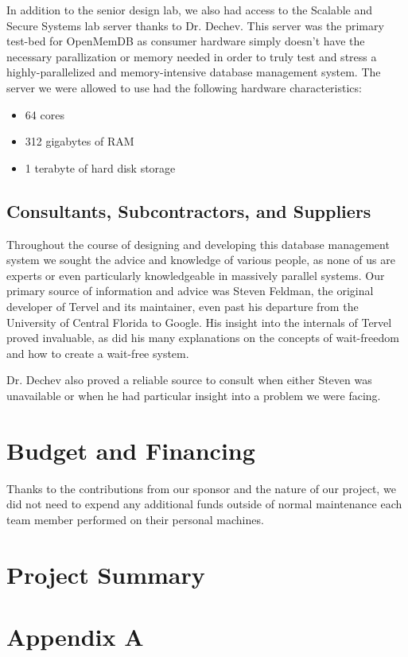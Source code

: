 \documentclass[letterpaper, 12pt]{article}
\begin{document}
\par\vspace{\baselineskip}
In addition to the senior design lab, we also had access to the Scalable and Secure Systems lab server
thanks to Dr. Dechev. This server was the primary test-bed for OpenMemDB as consumer hardware simply
doesn't have the necessary parallization or memory needed in order to truly test and stress a
highly-parallelized and memory-intensive database management system. The server we were allowed to
use had the following hardware characteristics:
\begin{itemize}
 \item 64 cores
 \item 312 gigabytes of RAM
 \item 1 terabyte of hard disk storage
\end{itemize}

\newpage

\subsection{Consultants, Subcontractors, and Suppliers}
Throughout the course of designing and developing this database management system we sought the advice
and knowledge of various people, as none of us are experts or even particularly knowledgeable in
massively parallel systems. Our primary source of information and advice was Steven Feldman, the
original developer of Tervel and its maintainer, even past his departure from the University of Central
Florida to Google. His insight into the internals of Tervel proved invaluable, as did his many
explanations on the concepts of wait-freedom and how to create a wait-free system.
\par\vspace{\baselineskip}
Dr. Dechev also proved a reliable source to consult when either Steven was unavailable or when he
had particular insight into a problem we were facing.
\newpage

\section{Budget and Financing}
Thanks to the contributions from our sponsor and the nature of our project, we did not need to expend
any additional funds outside of normal maintenance each team member performed on their personal
machines.
\newpage

\section{Project Summary}
\newpage



\newpage

\appendix
\section{Appendix A}
\end{document}

